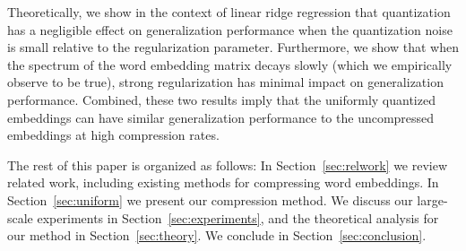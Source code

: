 Theoretically, we show in the context of linear ridge regression that quantization has a negligible effect on generalization performance when the quantization noise is small relative to the regularization parameter.
Furthermore, we show that when the spectrum of the word embedding matrix decays slowly (which we empirically observe to be true), strong regularization has minimal impact on generalization performance.
Combined, these two results imply that the uniformly quantized embeddings can have similar generalization performance to the uncompressed embeddings at high compression rates.

The rest of this paper is organized as follows:
In Section~\ref{sec:relwork} we review related work, including existing methods for compressing word embeddings.
In Section~\ref{sec:uniform} we present our compression method.
We discuss our large-scale experiments in Section~\ref{sec:experiments}, and the theoretical analysis for our method in Section~\ref{sec:theory}.
We conclude in Section~\ref{sec:conclusion}.

